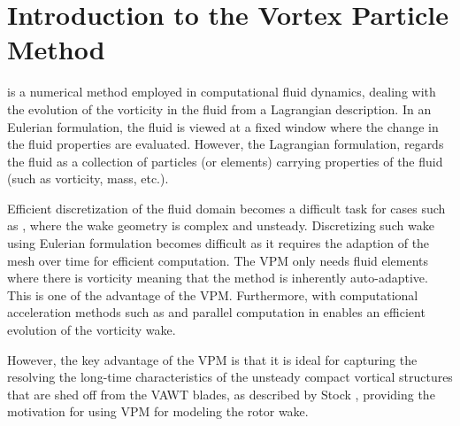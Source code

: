 

\section{Introduction to the Vortex Particle Method}
\label{sec:introtovpm}
 is a numerical method employed in computational fluid dynamics, dealing with the evolution of the vorticity in the fluid from a Lagrangian description. In an Eulerian formulation, the fluid is viewed at a fixed window where the change in the fluid properties are evaluated. However, the Lagrangian formulation, regards the fluid as a collection of particles (or elements) carrying properties of the fluid (such as vorticity, mass, etc.). 

Efficient discretization of the fluid domain becomes a difficult task for cases such as , where the wake geometry is complex and unsteady. Discretizing such wake using Eulerian formulation becomes difficult as it requires the adaption of the mesh over time for efficient computation. The VPM only needs fluid elements where there is vorticity meaning that the method is inherently auto-adaptive. This is one of the advantage of the VPM. Furthermore, with computational acceleration methods such as  and parallel computation in  enables an efficient evolution of the vorticity wake. 

However, the key advantage of the VPM is that it is ideal for capturing the resolving the long-time characteristics of the unsteady compact vortical structures that are shed off from the VAWT blades, as described by Stock \cite{Stock2010a}, providing the motivation for using VPM for modeling the rotor wake.

